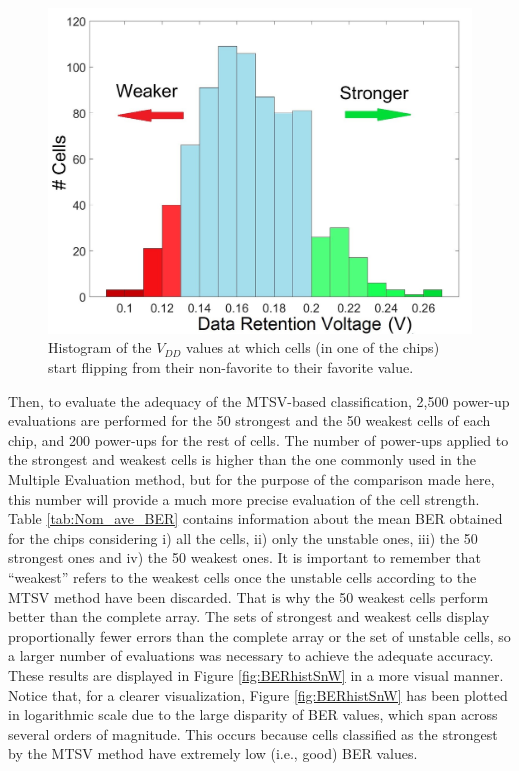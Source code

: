 \begin{figure}[t!]
    \centering
    \includegraphics[width=12cm]{images/DRV histogram.jpg}
    \caption{Histogram of the $V_{DD}$ values at which cells (in one of the chips) start flipping from their non-favorite to their favorite value. }
    \label{fig:DRVhist}
\end{figure}


Then, to evaluate the adequacy of the MTSV-based classification, 2,500 power-up evaluations are performed for the 50 strongest and the 50 weakest cells of each chip, and 200 power-ups for the rest of cells. The number of power-ups applied to the strongest and weakest cells is higher than the one commonly used in the Multiple Evaluation method, but for the purpose of the comparison made here, this number will provide a much more precise evaluation of the cell strength. Table \ref{tab:Nom_ave_BER} contains information about the mean BER obtained for the chips considering i) all the cells, ii) only the unstable ones, iii) the 50 strongest ones and iv) the 50 weakest ones. It is important to remember that “weakest” refers to the weakest cells once the unstable cells according to the MTSV method have been discarded. That is why the 50 weakest cells perform better than the complete array. The sets of strongest and weakest cells display proportionally fewer errors than the complete array or the set of unstable cells, so a larger number of evaluations was necessary to achieve the adequate accuracy. These results are displayed in Figure \ref{fig:BERhistSnW} in a more visual manner. Notice that, for a clearer visualization, Figure \ref{fig:BERhistSnW} has been plotted in logarithmic scale due to the large disparity of BER values, which span across several orders of magnitude. This occurs because cells classified as the strongest by the MTSV method have extremely low (i.e., good) BER values. 


